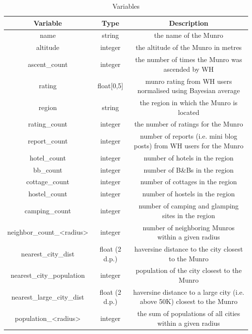 \documentclass[11pt,a4paper]{article}
\begin{document}
\begin{table}
    \centering
     \begin{tabular}{||c c c||} 
     \hline
     Variable & Type & Description  \\ 
     \hline\hline
     name & string & the name of the Munro \\ 
     \hline
     altitude & integer & the altitude of the Munro in metres \\
     \hline
     ascent\_count & integer & the number of times the Munro was ascended by WH \\
     \hline
     rating & float[0,5] & munro rating from WH users normalised using Bayesian average \\
     \hline
     region & string & the region in which the Munro is located \\
     \hline 
     rating\_count & integer & the number of ratings for the Munro \\
     \hline 
     report\_count & integer & number of reports (i.e. mini blog posts) from WH users for the Munro \\
     \hline 
     hotel\_count & integer & number of hotels in the region \\
     \hline 
     bb\_count & integer & number of B\&Bs in the region \\
     \hline 
     cottage\_count & integer & number of cottages in the region \\
     \hline
     hostel\_count & integer & number of hostels in the region \\
     \hline
     camping\_count & integer & number of camping and glamping sites in the region \\
     \hline
     neighbor\_count\_<radius> & integer & number of neighboring Munros within a given radius \\
     \hline 
     nearest\_city\_dist & float (2 d.p.) & haversine distance to the city closest to the Munro \\
     \hline
     nearest\_city\_population & integer & population of the city closest to the Munro \\
     \hline 
     nearest\_large\_city\_dist & float (2 d.p.) & haversine distance to a large city (i.e. above 50K) closest to the Munro \\
     \hline 
     population\_<radius> & integer & the sum of populations of all cities within a given radius \\
     \hline
    \end{tabular}
    \caption{Variables}
    \label{table:1}
\end{table}
\end{document}
